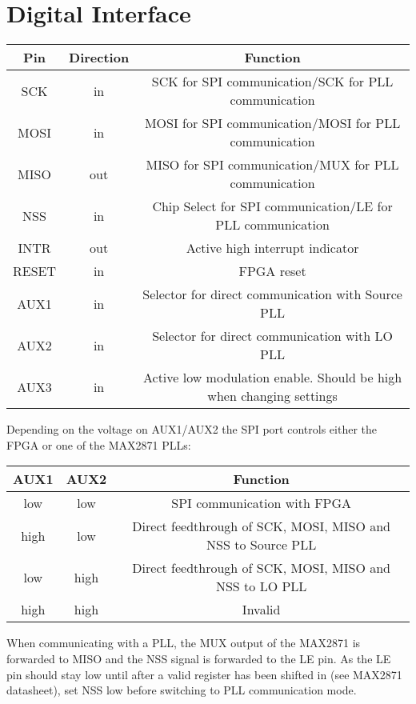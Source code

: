 \documentclass{article}
\begin{document}
\section{Digital Interface}
\begin{center}
\begin{tabular}{ c|c|c }
Pin & Direction & Function\\
 \hline
SCK & in & SCK for SPI communication/SCK for PLL communication\\
MOSI & in & MOSI for SPI communication/MOSI for PLL communication\\
MISO & out & MISO for SPI communication/MUX for PLL communication\\
NSS & in & Chip Select for SPI communication/LE for PLL communication\\
INTR & out & Active high interrupt indicator\\
RESET & in & FPGA reset\\
AUX1 & in & Selector for direct communication with Source PLL\\
AUX2 & in & Selector for direct communication with LO PLL\\
AUX3 & in & Active low modulation enable. Should be high when changing settings\\
\end{tabular}
\end{center}
Depending on the voltage on AUX1/AUX2 the SPI port controls either the FPGA or one of the MAX2871 PLLs:
\begin{center}
\begin{tabular}{ c|c|c }
AUX1 & AUX2 & Function\\
 \hline
low & low & SPI communication with FPGA\\
high & low & Direct feedthrough of SCK, MOSI, MISO and NSS to Source PLL\\
low & high & Direct feedthrough of SCK, MOSI, MISO and NSS to LO PLL\\
high & high & Invalid\\
\end{tabular}
\end{center}
When communicating with a PLL, the MUX output of the MAX2871 is forwarded to MISO and the NSS signal is forwarded to the LE pin. As the LE pin should stay low until after a valid register has been shifted in (see MAX2871 datasheet), set NSS low before switching to PLL communication mode.
\end{document}
